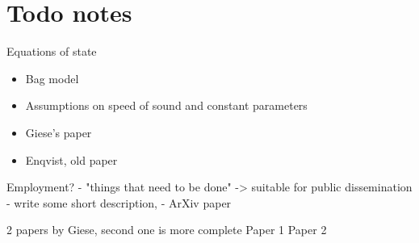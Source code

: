 \section{Todo notes}

Equations of state
\begin{itemize}
    \item Bag model \cite[eq. 7.33]{lecture_notes}
    \item Assumptions on speed of sound and constant parameters
    \item Giese's paper \cite{giese_2020}
    \item Enqvist, old paper \cite{enqvist_nucleation_1992}
\end{itemize}

Employment?
- "things that need to be done"
-> suitable for public dissemination
- write some short description,
    - ArXiv paper

2 papers by Giese, second one is more complete
Paper 1 \cite{giese_2020}
Paper 2 \cite{giese_2021}

